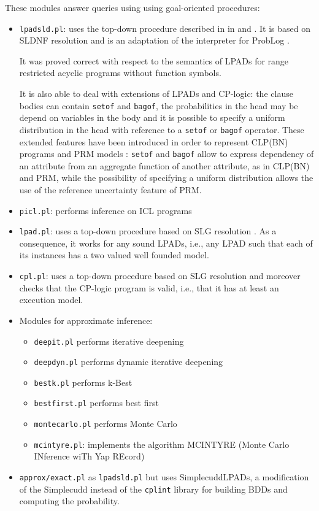 \documentclass[a4paper,10pt]{article}
\newcommand{\href}[2]{\Link[#1]{}{} #2 \EndLink}
\begin{document}
These modules answer queries using using goal-oriented procedures:
\begin{itemize}
\item \texttt{lpadsld.pl}: uses the top-down procedure described in 
in \cite{Rig-AIIA07-IC} and \cite{Rig-RCRA07-IC}. It is based on SLDNF resolution and is an adaptation of the interpreter for ProbLog \cite{DBLP:conf/ijcai/RaedtKT07}.

It was proved correct \cite{Rig-RCRA07-IC} with respect to the semantics of LPADs for range restricted acyclic programs \cite{DBLP:journals/ngc/AptB91} without function symbols.

It is also able to deal with extensions of LPADs and CP-logic: the clause bodies can contain \texttt{setof} and \texttt{bagof}, the probabilities in the head may be depend on variables in the body and it is possible to specify a uniform distribution in the head with reference to a \texttt{setof} or \texttt{bagof} operator. These extended features have been introduced in order to represent CLP(BN) \cite{SanPagQaz03-UAI-IC} programs and PRM models \cite{Getoor+al:JMLR02}:
\texttt{setof} and \texttt{bagof} allow to express dependency of an attribute from an aggregate function of another attribute, as in CLP(BN)  and PRM, while the possibility of specifying a uniform distribution allows the use of the reference uncertainty feature of PRM.
\item \texttt{picl.pl}: performs inference on ICL programs \cite{Rig09-LJIGPL-IJ}
\item \texttt{lpad.pl}: uses  a top-down procedure based on SLG resolution \cite{DBLP:journals/jacm/ChenW96}. As a consequence, it works for any sound LPADs, i.e., any LPAD such that each of its instances has a two valued well founded model. 
\item \texttt{cpl.pl}: uses a top-down procedure based on SLG resolution and moreover checks that the CP-logic program is valid, i.e., that it has at least an execution model.
\item Modules for approximate inference:
\begin{itemize}
\item \texttt{deepit.pl} performs iterative deepening \cite{BraRig10-ILP10-IC}
\item \texttt{deepdyn.pl} performs  dynamic iterative deepening \cite{BraRig10-ILP10-IC}
\item \texttt{bestk.pl} performs  k-Best \cite{BraRig10-ILP10-IC}
\item \texttt{bestfirst.pl} performs  best first \cite{BraRig10-ILP10-IC}
\item \texttt{montecarlo.pl} performs  Monte Carlo \cite{BraRig10-ILP10-IC}
\item \texttt{mcintyre.pl}: implements the algorithm MCINTYRE (Monte Carlo INference wiTh Yap REcord) \cite{Rig11-CILC11-NC}
\end{itemize}
\item \texttt{approx/exact.pl} as \texttt{lpadsld.pl} but uses  SimplecuddLPADs, a modification of the \href{www.cs.kuleuven.be/~theo/tools/simplecudd.html}{Simplecudd} instead of the \texttt{cplint} library for building BDDs and computing the probability.
\end{itemize}
\end{document}
